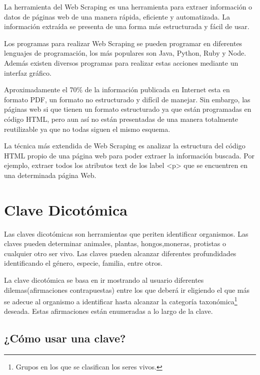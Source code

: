 La herramienta del Web Scraping es una herramienta para extraer información o datos de páginas web de una manera rápida, eficiente y automatizada. La información extraída se presenta de una forma más estructurada y fácil de usar.\cite{webScraping}

Los programas para realizar Web Scraping se pueden programar en diferentes lenguajes de programación, los más populares son Java, Python, Ruby y Node. Además existen diversos programas para realizar estas acciones mediante un interfaz gráfico.

Aproximadamente el 70\% de la información publicada en Internet esta en formato PDF, un formato no estructurado y difícil de manejar. Sin embargo, las páginas web si que tienen un formato estructurado ya que están programadas en código HTML, pero aun así no están presentadas de una manera totalmente reutilizable ya que no todas siguen el mismo esquema.

La técnica más extendida de Web Scraping es analizar la estructura del código HTML propio de una página web para poder extraer la información buscada. Por ejemplo, extraer todos los atributos text de los label <p> que se encuentren en una determinada página Web.


\section{Clave Dicotómica}

Las claves dicotómicas son herramientas que periten identificar organismos. Las claves pueden determinar animales, plantas, hongos,moneras, protistas o cualquier otro ser vivo. Las claves pueden alcanzar diferentes profundidades identificando el género, especie, familia, entre otros.

La clave dicotómica se basa en ir mostrando al usuario diferentes dilemas(afirmaciones contrapuestas) entre los que deberá ir eligiendo el que más se adecue al organismo a identificar hasta alcanzar la categoría taxonómica\footnote{Grupos en los que se clasifican los seres vivos.} deseada. Estas afirmaciones están enumeradas a lo largo de la clave.

\subsection{¿Cómo usar una clave?}

